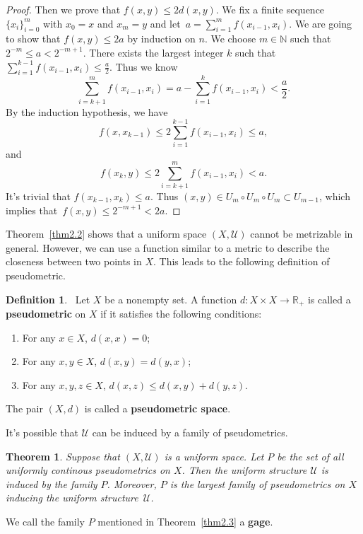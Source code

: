 \documentclass[12pt,a4paper,draft]{article}  %
\newtheorem{theorem}{Theorem}[section]
\theoremstyle{definition}
\newtheorem{definition}{Definition}[section]
\numberwithin{equation}{section}
\newcommand{\RR}{\mathbb{R}}
\newcommand{\NN}{\mathbb{N}}
\begin{document}
\begin{proof}
    Then we prove that $f(x,y) \leq 2d(x,y)$.
    We fix a finite sequence $\{x_i\}_{i=0}^m$ with $x_0=x$ and $x_m=y$ 
    and let~$a = \sum_{i=1}^m f(x_{i-1},x_i)$. 
    We are going to show that $f(x,y) \leq 2a$ by induction on $n$.
    We choose $m \in \NN$ such that $2^{-m} \leq a < 2^{-m+1}$.
    There exists the largest integer $k$ such that $\sum_{i=1}^{k-1} f(x_{i-1},x_i) \leq \frac{a}{2}$.
    Thus we know 
    $$\sum_{i=k+1}^m f(x_{i-1},x_i) = a-\sum_{i=1}^{k} f(x_{i-1},x_i) < \frac{a}{2}.$$
    By the induction hypothesis, we have 
    $$ f(x,x_{k-1}) \leq 2\sum_{i=1}^{k-1} f(x_{i-1},x_i) \leq a, $$
    and
    $$ f(x_{k},y) \leq 2\sum_{i=k+1}^{m} f(x_{i-1},x_i) < a. $$
    It's trivial that $f(x_{k-1},x_k) \leq a$.
    Thus $(x,y) \in U_m \circ U_m \circ U_m \subset U_{m-1}$, which
    implies that~$f(x,y) \leq 2^{-m+1} < 2a$.
\end{proof}
Theorem~\eqref{thm2.2} shows that a uniform space $(X,\mathcal{U})$ cannot be metrizable in general.
However, we can use a function similar to a metric to describe the closeness between two points in $X$.
This leads to the following definition of pseudometric.
\begin{definition}~\label{def2.2}
    Let $X$ be a nonempty set. A function $d:X \times X \rightarrow \RR_+$ is called a \textbf{pseudometric} on $X$ if it satisfies the following conditions:
    \begin{enumerate}
        \item For any $x \in X$, $d(x,x)=0$;
        \item For any $x,y \in X$, $d(x,y)=d(y,x)$;
        \item For any $x,y,z \in X$, $d(x,z) \leq d(x,y) + d(y,z)$.
    \end{enumerate}
    The pair $(X,d)$ is called a \textbf{pseudometric space}.
\end{definition}
It's possible that $\mathcal{U}$ can be induced by a family of pseudometrics.
\begin{theorem} \label{thm2.3}
    Suppose that $(X,\mathcal{U})$ is a uniform space.
    Let $P$ be the set of all uniformly continous pseudometrics on $X$.
    Then the uniform structure $\mathcal{U}$ is induced by the family $P$.
    Moreover, $P$ is the largest family of pseudometrics on $X$ inducing the uniform structure~$\mathcal{U}$.
\end{theorem}
We call the family $P$ mentioned in Theorem~\eqref{thm2.3} a \textbf{gage}.
\end{document}
